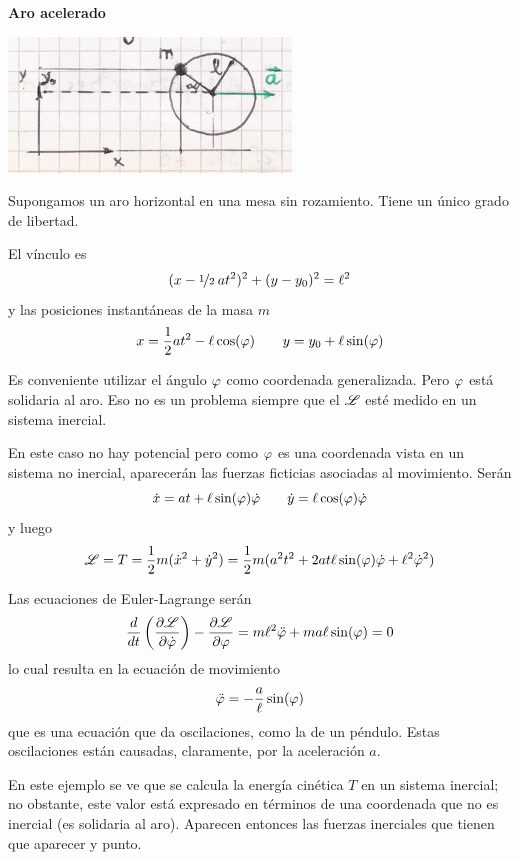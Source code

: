 \documentclass[10pt,oneside]{CBFT_book}
\begin{document}
\begin{ejemplo}{\bfseries Aro acelerado }

\includegraphics[scale=0.35]{images/fig_mc_aro_acelerado_lag.jpg}

Supongamos un aro horizontal en una mesa sin rozamiento. Tiene un único grado de libertad.

El vínculo es
\[
	(x - \nicefrac{1}{2} \: at^2)^2 + (y-y_0 )^2 = \ell^2
\]
y las posiciones instantáneas de la masa $ m $
\[
	x = \frac{1}{2}at^2 - \ell \cos(\varphi) \qquad  y = y_0 + \ell \sin(\varphi)
\]

Es conveniente utilizar el ángulo $\varphi$ como coordenada generalizada. Pero $\varphi$ está solidaria al aro.
Eso no es un problema siempre que el $\mathscr{L}$ esté medido en un sistema inercial.

En este caso no hay potencial pero como $\varphi$ es una coordenada vista en un sistema no inercial, aparecerán
las fuerzas ficticias asociadas al movimiento.
Serán
\[
	\dot{x} = at + \ell \sin(\varphi) \dot{\varphi} \qquad \dot{y} = \ell \cos(\varphi) \dot{\varphi}
\]
y luego 
\[
	\mathscr{L} = T = \frac{1}{2} m (\dot{x}^2 + \dot{y}^2 ) = \frac{1}{2} m
	(a^2 t^2 + 2at\ell\sin(\varphi)\dot{\varphi}+\ell^2\dot{\varphi}^2)
\]

Las ecuaciones de Euler-Lagrange serán 
\[
	\frac{d^{\hspace{-0.05em}} {}}{d {t}^{\hspace{-0.05em}}}\left( \frac{\partial^{\hspace{-0.05em}} {\mathscr{L}}}{\partial {\dot{\varphi}}^{\hspace{-0.05em}}}\right) - \frac{\partial^{\hspace{-0.05em}} {\mathscr{L}}}{\partial {\varphi}^{\hspace{-0.05em}}} = 
	m \ell^2 \ddot{\varphi} + ma\ell \sin(\varphi) = 0
\]
lo cual resulta en la ecuación de movimiento
\[
	\ddot{\varphi} = - \frac{a}{\ell} \sin(\varphi) 
\]
que es una ecuación que da oscilaciones, como la de un péndulo. Estas oscilaciones están causadas, claramente,
por la aceleración $a$.

En este ejemplo se ve que se calcula la energía cinética $T$ en un sistema inercial; no obstante, este valor está
expresado en términos de una coordenada que no es inercial (es solidaria al aro). Aparecen entonces las fuerzas 
inerciales que tienen que aparecer y punto.
\end{ejemplo}
\end{document}
